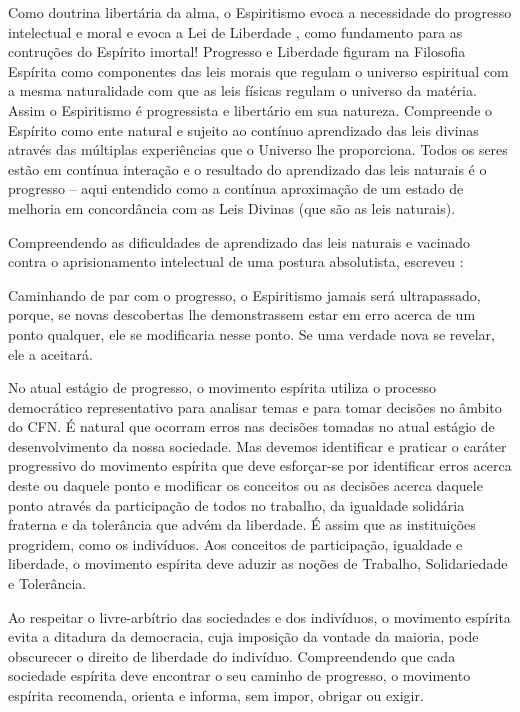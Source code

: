 Como doutrina libertária da alma, o Espiritismo evoca a necessidade do progresso intelectual e moral \cite[Parte III. Cap. VII ]{Kardec1857} e evoca a Lei de Liberdade \cite[Parte III. Cap.X]{Kardec1857}, como fundamento para as contruções do Espírito imortal! Progresso e Liberdade figuram na Filosofia Espírita como componentes das leis morais que regulam o universo espiritual com a mesma naturalidade com que as leis físicas regulam o universo da matéria. Assim o Espiritismo é progressista e libertário em sua natureza. Compreende o Espírito como ente natural e sujeito ao contínuo aprendizado das leis divinas através das múltiplas experiências que o Universo lhe proporciona. Todos os seres estão em contínua interação e o resultado do aprendizado das leis naturais é o progresso -- aqui entendido como a contínua aproximação de um estado de melhoria em concordância com as Leis Divinas (que são as leis naturais). 

Compreendendo as dificuldades de aprendizado das leis naturais e vacinado contra o aprisionamento intelectual de uma postura absolutista, escreveu :

\begin{citacao}
	Caminhando de par com o progresso, o Espiritismo jamais será ultrapassado, porque, se novas descobertas lhe demonstrassem estar em erro acerca de um ponto qualquer, ele se modificaria nesse ponto. Se uma verdade nova se revelar, ele a aceitará.

\end{citacao}

No atual estágio de progresso, o movimento espírita utiliza o processo democrático representativo para analisar temas e para tomar decisões no âmbito do CFN. É natural que ocorram erros nas decisões tomadas no atual estágio de desenvolvimento da nossa sociedade. Mas devemos identificar e praticar o caráter progressivo do movimento espírita que deve esforçar-se por identificar erros acerca deste ou daquele ponto e modificar os conceitos ou as decisões acerca daquele ponto através da participação de todos no trabalho, da igualdade solidária fraterna e da tolerância que advém da liberdade. É assim que as instituições progridem, como os indivíduos. Aos conceitos de participação, igualdade e liberdade, o movimento espírita deve aduzir as noções de Trabalho, Solidariedade e Tolerância.

Ao respeitar o livre-arbítrio das sociedades e dos indivíduos, o movimento espírita evita a ditadura da democracia, cuja imposição da vontade da maioria, pode obscurecer o direito de liberdade do indivíduo. Compreendendo que cada sociedade espírita deve encontrar o seu caminho de progresso, o movimento espírita recomenda, orienta e informa, sem impor, obrigar ou exigir. 

